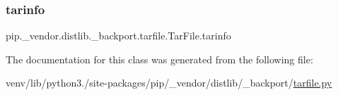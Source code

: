 \subsubsection{\texorpdfstring{tarinfo}{tarinfo}}
{\footnotesize\ttfamily pip.\+\_\+vendor.\+distlib.\+\_\+backport.\+tarfile.\+Tar\+File.\+tarinfo\hspace{0.3cm}{\ttfamily [static]}}



The documentation for this class was generated from the following file\+:\begin{DoxyCompactItemize}
\item 
venv/lib/python3./site-\/packages/pip/\+\_\+vendor/distlib/\+\_\+backport/\hyperlink{tarfile_8py}{tarfile.\+py}\end{DoxyCompactItemize}
